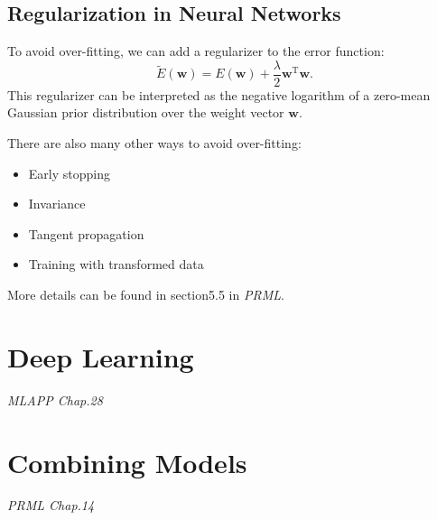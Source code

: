 \documentclass{article}
\newcommand{\mrm}{\mathrm}
\newcommand{\mbf}{\mathbf}
\newcommand{\ww}{\mbf w}
\newcommand{\trans}{^{\mrm T}}
\newcommand{\tit}{\textit}
\begin{document}
\subsection{Regularization in Neural Networks}
To avoid over-fitting, we can add a regularizer to the error function:
\begin{equation}\label{}
  \tilde{E}(\ww) = E(\ww)+\frac{\lambda}{2}\ww\trans\ww.
\end{equation}
This regularizer can be interpreted as the negative logarithm of a zero-mean Gaussian prior distribution over the weight vector $\ww$.

There are also many other ways to avoid over-fitting:
\begin{itemize}
  \item Early stopping
  \item Invariance
  \item Tangent propagation
  \item Training with transformed data
\end{itemize}
More details can be found in section5.5 in \tit{PRML}.

\section{Deep Learning}
\emph{MLAPP Chap.28}

\section{Combining Models}
\emph{PRML Chap.14}
\end{document}
